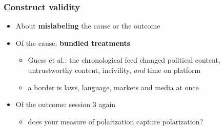 \begin{frame}
\frametitle{Construct validity}
\centering

\begin{itemize}
  \item About \textbf{mislabeling} the cause or the outcome
  \vspace{8pt}
  \item Of the cause: \textbf{bundled treatments}
  \begin{itemize}
    \item Guess et al.: the chronological feed changed political content, untrustworthy content, incivility, \textit{and} time on platform
    \item a border is laws, language, markets and media at once
  \end{itemize}
  \vspace{8pt}
  \item<2-> Of the outcome: session 3 again
  \begin{itemize}
    \item does your measure of polarization capture polarization?
  \end{itemize}
\end{itemize}

\end{frame}

